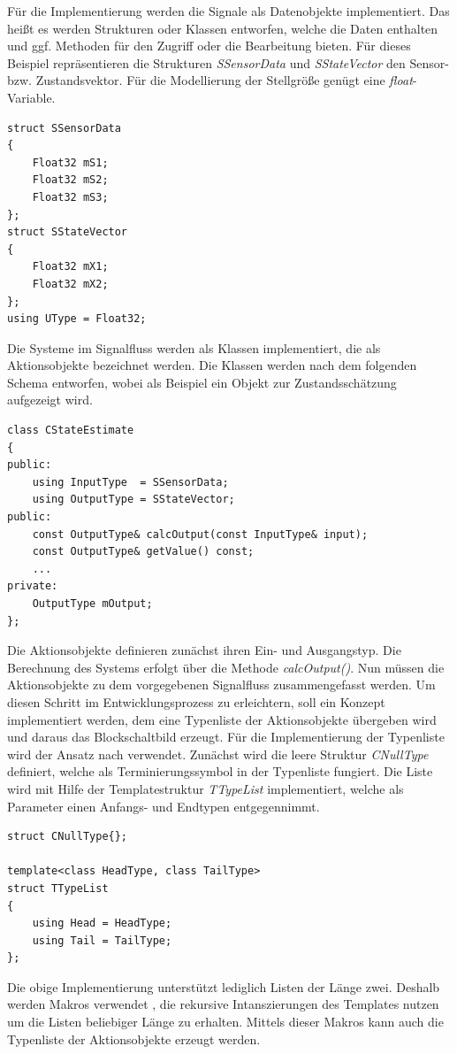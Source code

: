 Für die Implementierung werden die Signale als Datenobjekte implementiert. Das heißt es werden Strukturen oder Klassen entworfen, welche die Daten enthalten und ggf. Methoden für den Zugriff oder die Bearbeitung bieten. Für dieses Beispiel repräsentieren die Strukturen \textit{SSensorData} und \textit{SStateVector} den Sensor- bzw. Zustandsvektor. Für die Modellierung der Stellgröße genügt eine \textit{float}-Variable.
\begin{lstlisting}[caption={Beispielhafte Implementierung eines Datenobjektes},captionpos=b]
struct SSensorData
{
	Float32 mS1;
	Float32 mS2;
	Float32 mS3;
};
struct SStateVector
{
	Float32 mX1;
	Float32 mX2;
};
using UType = Float32;
\end{lstlisting}
Die Systeme im Signalfluss werden als Klassen implementiert, die als Aktionsobjekte bezeichnet werden. Die Klassen werden nach dem folgenden Schema entworfen, wobei als Beispiel ein Objekt zur Zustandsschätzung aufgezeigt wird.
\begin{lstlisting}[caption={Beispielhafte Implementierung eines Aktionsobjektes},captionpos=b]
class CStateEstimate
{
public:
	using InputType	 = SSensorData;
	using OutputType = SStateVector;
public:
	const OutputType& calcOutput(const InputType& input);
	const OutputType& getValue() const;
	...
private:	 
	OutputType mOutput;
};
\end{lstlisting}
Die Aktionsobjekte definieren zunächst ihren Ein- und Ausgangstyp. Die Berechnung des Systems erfolgt über die Methode \textit{calcOutput()}.
Nun müssen die Aktionsobjekte zu dem vorgegebenen Signalfluss zusammengefasst werden. Um diesen Schritt im Entwicklungsprozess zu erleichtern, soll ein Konzept implementiert werden, dem eine Typenliste der Aktionsobjekte übergeben wird und daraus das Blockschaltbild erzeugt.
Für die Implementierung der Typenliste wird der Ansatz nach \cite[S. 40 ff.]{ModernCpp} verwendet. Zunächst wird die leere Struktur \textit{CNullType} definiert, welche als Terminierungssymbol in der Typenliste fungiert. Die Liste wird mit Hilfe der Templatestruktur \textit{TTypeList} implementiert, welche als Parameter einen Anfangs- und Endtypen entgegennimmt.
\begin{lstlisting}[caption={Implementierung der Typenliste},captionpos=b]
struct CNullType{};

template<class HeadType, class TailType>
struct TTypeList
{
	using Head = HeadType;
	using Tail = TailType;
};
\end{lstlisting}
Die obige Implementierung unterstützt lediglich Listen der Länge zwei. Deshalb werden Makros verwendet \cite[S. 45]{ModernCpp}, die rekursive Intanszierungen des Templates nutzen um die Listen beliebiger Länge zu erhalten. Mittels dieser Makros kann auch die Typenliste der Aktionsobjekte erzeugt werden.
